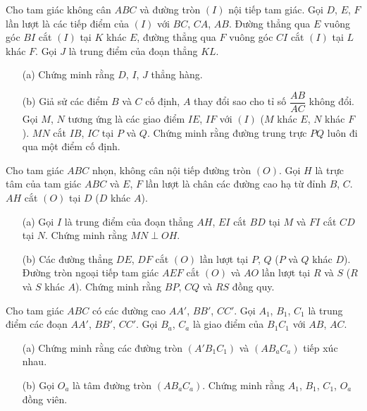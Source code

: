         \begin{exercise}
            Cho tam giác không cân \(ABC\) và đường tròn \((I)\) nội tiếp tam giác. Gọi \(D\), \(E\), \(F\) lần lượt là các tiếp điểm của \((I)\) với \(BC\), \(CA\), \(AB\). Đường thẳng qua \(E\) vuông góc \(BI\) cắt \((I)\) tại \(K\) khác \(E\), đường thẳng qua \(F\) vuông góc \(CI\) cắt \((I)\) tại \(L\) khác \(F\). Gọi \(J\) là trung điểm của đoạn thẳng \(KL\).
            \begin{itemize}
                \item[(a)] Chứng minh rằng \(D\), \(I\), \(J\) thẳng hàng.
                \item[(b)] Giả sử các điểm \(B\) và \(C\) cố định, \(A\) thay đổi sao cho tỉ số \(\dfrac{AB}{AC}\) không đổi. Gọi \(M\), \(N\) tương ứng là các giao điểm \(IE\), \(IF\) với \((I)\) (\(M\) khác \(E\), \(N\) khác \(F\)). \(MN\) cắt \(IB\), \(IC\) tại \(P\) và \(Q\). Chứng minh rằng đường trung trực \(PQ\) luôn đi qua một điểm cố định.
            \end{itemize}
        \end{exercise}

        \boom

        \begin{exercise}
            Cho tam giác \(ABC\) nhọn, không cân nội tiếp đường tròn \((O)\). Gọi \(H\) là trực tâm của tam giác \(ABC\) và \(E\), \(F\) lần lượt là chân các đường cao hạ từ đỉnh \(B\), \(C\). \(AH\) cắt \((O)\) tại \(D\) (\(D\) khác \(A\)).
            \begin{itemize}
                \item[(a)] Gọi \(I\) là trung điểm của đoạn thẳng \(AH\), \(EI\) cắt \(BD\) tại \(M\) và \(FI\) cắt \(CD\) tại \(N\). Chứng minh rằng \(MN \perp OH\).
                \item[(b)] Các đường thẳng \(DE\), \(DF\) cắt \((O)\) lần lượt tại \(P\), \(Q\) (\(P\) và \(Q\) khác \(D\)). Đường tròn ngoại tiếp tam giác \(AEF\) cắt \((O)\) và \(AO\) lần lượt tại \(R\) và \(S\) (\(R\) và \(S\) khác \(A\)). Chứng minh rằng \(BP\), \(CQ\) và \(RS\) đồng quy.
            \end{itemize}
        \end{exercise}

        \boom

        \begin{exercise}
            Cho tam giác \(ABC\) có các đường cao \(AA'\), \(BB'\), \(CC'\). Gọi \(A_1\), \(B_1\), \(C_1\) là trung điểm các đoạn \(AA'\), \(BB'\), \(CC'\). Gọi \(B_a\), \(C_a\) là giao điểm của \(B_1C_1\) với \(AB\), \(AC\).
            \begin{enumerate}
                \item[(a)] Chứng minh rằng các đường tròn \((A'B_1C_1)\) và \((AB_aC_a)\) tiếp xúc nhau.
                \item[(b)] Gọi \(O_a\) là tâm đường tròn \((AB_aC_a)\). Chứng minh rằng \(A_1\), \(B_1\), \(C_1\), \(O_a\) đồng viên.
            \end{enumerate}
        \end{exercise}

